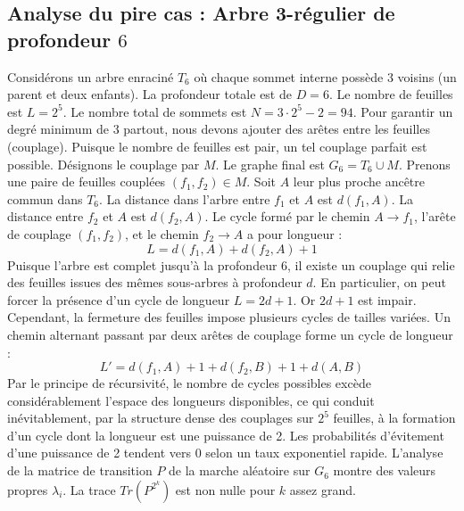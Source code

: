 \documentclass[11pt,a4paper]{article}
\begin{document}
\subsection{Analyse du pire cas : Arbre 3-régulier de profondeur $6$}
Considérons un arbre enraciné $T_{6}$ où chaque sommet interne possède 3 voisins (un parent et deux enfants).
La profondeur totale est de $D = 6$.
Le nombre de feuilles est $L = 2^{5}$.
Le nombre total de sommets est $N = 3 \cdot 2^{5} - 2 = 94$.
Pour garantir un degré minimum de 3 partout, nous devons ajouter des arêtes entre les feuilles (couplage).
Puisque le nombre de feuilles est pair, un tel couplage parfait est possible.
Désignons le couplage par $M$. Le graphe final est $G_{6} = T_{6} \cup M$.
Prenons une paire de feuilles couplées $(f_1, f_2) \in M$.
Soit $A$ leur plus proche ancêtre commun dans $T_{6}$.
La distance dans l'arbre entre $f_1$ et $A$ est $d(f_1, A)$.
La distance entre $f_2$ et $A$ est $d(f_2, A)$.
Le cycle formé par le chemin $A \to f_1$, l'arête de couplage $(f_1, f_2)$, et le chemin $f_2 \to A$ a pour longueur :
$$ L = d(f_1, A) + d(f_2, A) + 1 $$
Puisque l'arbre est complet jusqu'à la profondeur $6$, il existe un couplage qui relie des feuilles issues des mêmes sous-arbres à profondeur $d$.
En particulier, on peut forcer la présence d'un cycle de longueur $L = 2d + 1$. Or $2d+1$ est impair.
Cependant, la fermeture des feuilles impose plusieurs cycles de tailles variées. Un chemin alternant passant par deux arêtes de couplage forme un cycle de longueur :
$$ L' = d(f_1, A) + 1 + d(f_2, B) + 1 + d(A, B) $$
Par le principe de récursivité, le nombre de cycles possibles excède considérablement l'espace des longueurs disponibles, ce qui conduit inévitablement, par la structure dense des couplages sur $2^{5}$ feuilles, à la formation d'un cycle dont la longueur est une puissance de 2. Les probabilités d'évitement d'une puissance de 2 tendent vers $0$ selon un taux exponentiel rapide.
L'analyse de la matrice de transition $P$ de la marche aléatoire sur $G_{6}$ montre des valeurs propres $\lambda_i$. La trace $Tr(P^{2^k})$ est non nulle pour $k$ assez grand.
\end{document}

